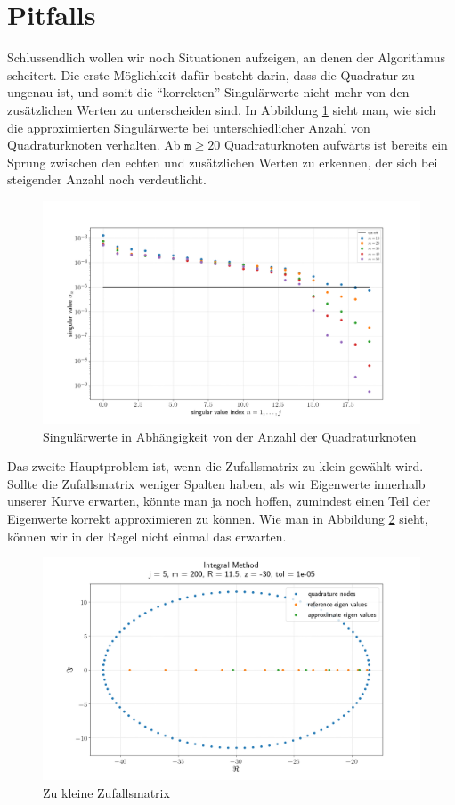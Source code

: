 \section{Pitfalls}

Schlussendlich wollen wir noch Situationen aufzeigen, an denen der Algorithmus scheitert.
Die erste Möglichkeit dafür besteht darin, dass die Quadratur zu ungenau ist, und somit die \enquote{korrekten} Singulärwerte nicht mehr von den zusätzlichen Werten zu unterscheiden sind.
In Abbildung \ref{fig:plot4} sieht man, wie sich die approximierten Singulärwerte bei unterschiedlicher Anzahl von Quadraturknoten verhalten.
Ab $\texttt{m} \geq 20$ Quadraturknoten aufwärts ist bereits ein Sprung zwischen den echten und zusätzlichen Werten zu erkennen, der sich bei steigender Anzahl noch verdeutlicht.

\begin{figure}[H]
  \includegraphics[width = \linewidth]{Plots/singulaerwerte_quadraturknoten.png}
  \caption{Singulärwerte in Abhängigkeit von der Anzahl der Quadraturknoten}
  \label{fig:plot4}
\end{figure}

Das zweite Hauptproblem ist, wenn die Zufallsmatrix zu klein gewählt wird.
Sollte die Zufallsmatrix weniger Spalten haben, als wir Eigenwerte innerhalb unserer Kurve erwarten, könnte man ja noch hoffen, zumindest einen Teil der Eigenwerte korrekt approximieren zu können.
Wie man in Abbildung \ref{fig:plot5} sieht, können wir in der Regel nicht einmal das erwarten.

\begin{figure}[H]
  \includegraphics[width = \linewidth]{Plots/zufallsmatrix_zu_klein.png}
  \caption{Zu kleine Zufallsmatrix}
  \label{fig:plot5}
\end{figure}
